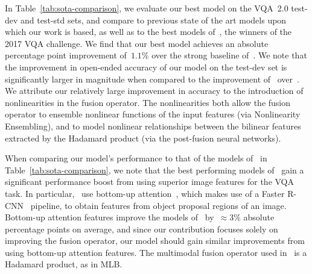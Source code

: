 In Table~\ref{tab:sota-comparison}, we evaluate our best model on the VQA~2.0
test-dev and test-std sets, and compare to previous state of the art models
upon which our work is based, as well as to the best models
of~\citet{teney2017tips}, the winners of the 2017 VQA challenge. We
find that our best model achieves an absolute percentage point improvement
of~$1.1\%$ over the strong baseline of~\citet{ben2017mutan}. We note that the
improvement in open-ended accuracy of our model on the test-dev set is
significantly larger in magnitude when compared to the improvement
of~\citet{ben2017mutan} over~\citet{fukui2016multimodalCB}. We attribute
our relatively large improvement in accuracy to the introduction of
nonlinearities in the fusion operator. The nonlinearities both allow the fusion
operator to ensemble nonlinear functions of the input features (via
Nonlinearity Ensembling), and to model nonlinear relationships between the
bilinear features extracted by the Hadamard product (via the post-fusion neural
networks).

When comparing our model's performance to that of the models
of~\citet{teney2017tips} in Table~\ref{tab:sota-comparison}, we note that the
best performing models of~\citet{teney2017tips} gain a significant performance
boost from using superior image features for the VQA task. In
particular,~\citet{teney2017tips} use bottom-up
attention~\citep{anderson2017bottom}, which makes use of a Faster
R-CNN~\citep{ren2015faster} pipeline, to obtain features from object proposal
regions of an image. Bottom-up attention features improve the models
of~\citet{teney2017tips} by~$\approx 3\%$ absolute percentage points on average,
and since our contribution focuses solely on improving the fusion operator, our
model should gain similar improvements from using bottom-up attention features.
The multimodal fusion operator used in~\citet{teney2017tips} is a Hadamard
product, as in MLB\@.

